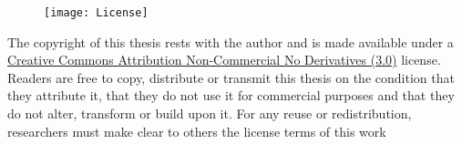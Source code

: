 \newpage \vspace*{8cm}
\thispagestyle{empty}

\begin{center}

\begin{figure}[ht]
    \centering
    \texttt{[image: License]}
\end{figure}

   The copyright of this thesis rests with the author and is made available under a \href{https://creativecommons.org/licenses/by-nc-nd/3.0/}{Creative Commons Attribution Non-Commercial No Derivatives (3.0)} license. Readers are free to copy, distribute or transmit this thesis on the condition that they attribute it, that they do not use it for commercial purposes and that they do not alter, transform or build upon it. For any reuse or redistribution, researchers must make clear to others the license terms of this work
\end{center}
